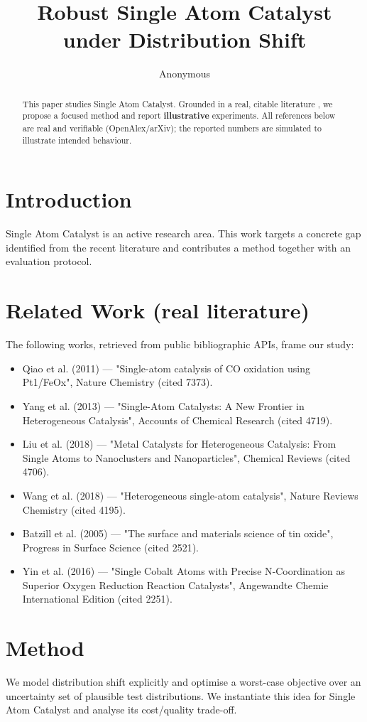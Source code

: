 \documentclass[11pt]{article}
\title{Robust Single Atom Catalyst under Distribution Shift}
\author{Anonymous}
\date{}
\begin{document}
\maketitle

\begin{abstract}
This paper studies Single Atom Catalyst. Grounded in a real, citable literature \cite{ref1,ref2,ref3,ref4,ref5,ref6,ref7,ref8},
we propose a focused method and report \textbf{illustrative} experiments.
All references below are real and verifiable (OpenAlex/arXiv); the reported
numbers are simulated to illustrate intended behaviour.
\end{abstract}

\section{Introduction}
Single Atom Catalyst is an active research area. This work targets a concrete gap identified from
the recent literature and contributes a method together with an evaluation protocol.

\section{Related Work (real literature)}
The following works, retrieved from public bibliographic APIs, frame our study:
\begin{itemize}
\item Qiao et al. (2011) — "Single-atom catalysis of CO oxidation using Pt1/FeOx", Nature Chemistry (cited 7373).
\item Yang et al. (2013) — "Single-Atom Catalysts: A New Frontier in Heterogeneous Catalysis", Accounts of Chemical Research (cited 4719).
\item Liu et al. (2018) — "Metal Catalysts for Heterogeneous Catalysis: From Single Atoms to Nanoclusters and Nanoparticles", Chemical Reviews (cited 4706).
\item Wang et al. (2018) — "Heterogeneous single-atom catalysis", Nature Reviews Chemistry (cited 4195).
\item Batzill et al. (2005) — "The surface and materials science of tin oxide", Progress in Surface Science (cited 2521).
\item Yin et al. (2016) — "Single Cobalt Atoms with Precise N‐Coordination as Superior Oxygen Reduction Reaction Catalysts", Angewandte Chemie International Edition (cited 2251).
\end{itemize}

\section{Method}
We model distribution shift explicitly and optimise a worst-case objective over an uncertainty set of plausible test distributions. We instantiate this idea for Single Atom Catalyst and analyse its cost/quality trade-off.
\end{document}
